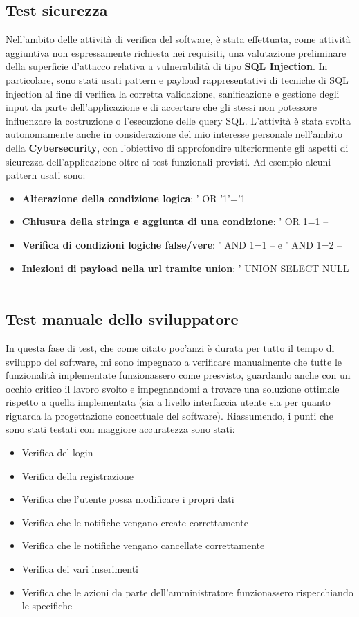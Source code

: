 \documentclass{article}
\begin{document}
\subsection{Test sicurezza}
Nell'ambito delle attività di verifica del software, è stata effettuata, come attività aggiuntiva non espressamente richiesta nei requisiti, una valutazione preliminare della superficie
d'attacco relativa a vulnerabilità di tipo \textbf{SQL Injection}. In particolare, sono stati usati pattern e payload rappresentativi
di tecniche di SQL injection al fine di verifica la corretta validazione, sanificazione e gestione degli input da parte dell'applicazione e di accertare che gli stessi non potessore influenzare la costruzione
o l'esecuzione delle query SQL.
\vspace{1em}
\noindent
\newline
L'attività è stata svolta autonomamente anche in considerazione del mio interesse personale
nell'ambito della \textbf{Cybersecurity}, con l'obiettivo di approfondire ulteriormente gli aspetti di sicurezza dell'applicazione
oltre ai test funzionali previsti. Ad esempio alcuni pattern usati sono:
\begin{itemize}
   \item \textbf{Alterazione della condizione logica}: ' OR '1'='1
   \item \textbf{Chiusura della stringa e aggiunta di una condizione}: ' OR 1=1 --
   \item \textbf{Verifica di condizioni logiche false/vere}: ' AND 1=1 -- e ' AND 1=2 --
   \item \textbf{Iniezioni di payload nella url tramite union}: ' UNION SELECT NULL --
\end{itemize}
\subsection{Test manuale dello sviluppatore}
In questa fase di test, che come citato poc'anzi è durata per tutto il tempo di sviluppo del software, mi sono impegnato a verificare
manualmente che tutte le funzionalità implementate funzionassero come presvisto, guardando anche con un occhio critico il lavoro svolto e impegnandomi a trovare una soluzione
ottimale rispetto a quella implementata (sia a livello interfaccia utente sia per quanto riguarda la progettazione concettuale del software).
\vspace{1em}
\noindent
\newline
Riassumendo, i punti che sono stati testati con maggiore accuratezza sono stati:
\begin{itemize}
   \item Verifica del login
   \item Verifica della registrazione
   \item Verifica che l'utente possa modificare i propri dati
   \item Verifica che le notifiche vengano create correttamente
   \item Verifica che le notifiche vengano cancellate correttamente
   \item Verifica dei vari inserimenti
   \item Verifica che le azioni da parte dell'amministratore funzionassero rispecchiando le specifiche
\end{itemize}
\end{document}
